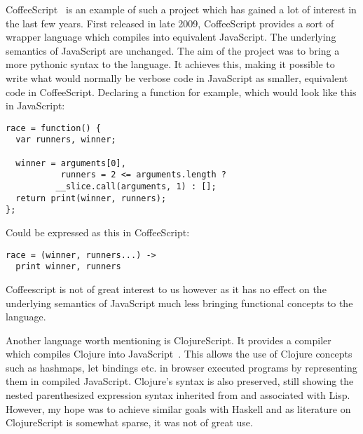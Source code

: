 CoffeeScript~\cite{Coffee} is an example of such a project which has gained a lot
of interest in the last few years. First released in late 2009, 
CoffeeScript provides a sort of wrapper language which compiles into
equivalent JavaScript. The underlying semantics of JavaScript are
unchanged. The aim of the project was to bring a more pythonic 
syntax to the language. It achieves this, making it possible to 
write what would normally be verbose code in JavaScript as 
smaller, equivalent code in CoffeeScript. Declaring a function for
example, which would look like this in JavaScript:

\begin{verbatim}
race = function() {
  var runners, winner;

  winner = arguments[0], 
           runners = 2 <= arguments.length ? 
          __slice.call(arguments, 1) : [];
  return print(winner, runners);
};
\end{verbatim}

\noindent Could be expressed as this in CoffeeScript: 

\begin{verbatim}
race = (winner, runners...) ->
  print winner, runners
\end{verbatim}

\noindent Coffeescript is not of great interest to us however as it has no
effect on the underlying semantics of JavaScript much less bringing
functional concepts to the language.

Another language worth mentioning is ClojureScript. It provides a compiler
which compiles Clojure into JavaScript~\cite{Clojure}. This allows the use of Clojure concepts
such as hashmaps, let bindings etc. in browser executed programs by 
representing them in compiled JavaScript. Clojure's syntax is also preserved,
still showing the nested parenthesized expression syntax inherited from and
associated with Lisp. However, my hope was to achieve similar goals with 
Haskell and as literature on ClojureScript is somewhat sparse, it was not
of great use.
